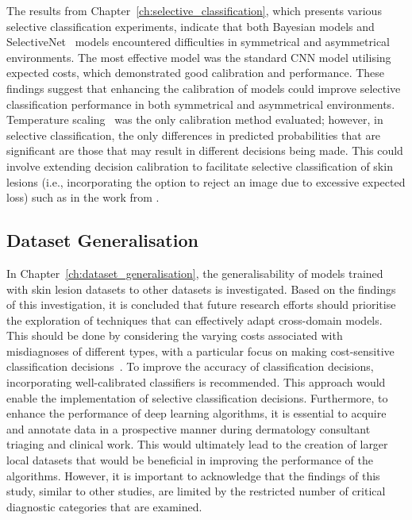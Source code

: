 The results from Chapter~\ref{ch:selective_classification}, which presents various selective classification experiments, indicate that both Bayesian models and SelectiveNet~\citep{geifman2019selectivenet} models encountered difficulties in symmetrical and asymmetrical environments. The most effective model was the standard CNN model utilising expected costs, which demonstrated good calibration and performance. These findings suggest that enhancing the calibration of models could improve selective classification performance in both symmetrical and asymmetrical environments. Temperature scaling~\citep{guo2017calibration} was the only calibration method evaluated; however, in selective classification, the only differences in predicted probabilities that are significant are those that may result in different decisions being made. This could involve extending decision calibration to facilitate selective classification of skin lesions (i.e., incorporating the option to reject an image due to excessive expected loss) such as in the work from \cite{zhao2021calibrating}.

\subsection{Dataset Generalisation}
In Chapter~\ref{ch:dataset_generalisation}, the generalisability of models trained with skin lesion datasets to other datasets is investigated. Based on the findings of this investigation, it is concluded that future research efforts should prioritise the exploration of techniques that can effectively adapt cross-domain models. This should be done by considering the varying costs associated with misdiagnoses of different types, with a particular focus on making cost-sensitive classification decisions~\citep{guan2021domain,carse2021robust}. To improve the accuracy of classification decisions, incorporating well-calibrated classifiers is recommended. This approach would enable the implementation of selective classification decisions. Furthermore, to enhance the performance of deep learning algorithms, it is essential to acquire and annotate data in a prospective manner during dermatology consultant triaging and clinical work. This would ultimately lead to the creation of larger local datasets that would be beneficial in improving the performance of the algorithms. However, it is important to acknowledge that the findings of this study, similar to other studies, are limited by the restricted number of critical diagnostic categories that are examined.